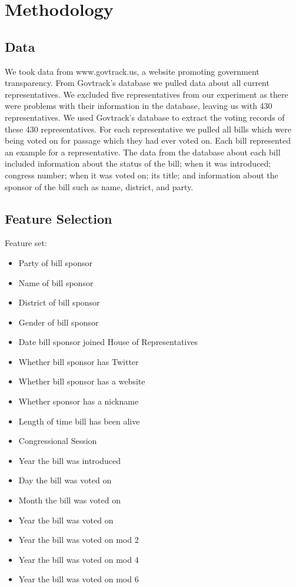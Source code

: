 \documentclass[11pt,letterpaper,twocolumn]{article}
\begin{document}
\section{Methodology}

\subsection{Data}

We took data from www.govtrack.us, a website promoting government transparency. From Govtrack's database we pulled data about all current representatives. We excluded five representatives from our experiment as there were problems with their information in the database, leaving us with 430 representatives. We used Govtrack's database to extract the voting records of these 430 representatives. For each representative we pulled all bills which were being voted on for passage which they had ever voted on. Each bill represented an example for a representative. The data from the database about each bill included information about the status of the bill; when it was introduced; congress number; when it was voted on; its title; and information about the sponsor of the bill such as name, district, and party. 

\subsection{Feature Selection}
Feature set:
\begin{itemize}
\item Party of bill sponsor
\item Name of bill sponsor
\item District of bill sponsor
\item Gender of bill sponsor
\item Date bill sponsor joined House of Representatives
\item Whether bill sponsor has Twitter
\item Whether bill sponsor has a website
\item Whether sponsor has a nickname
\item Length of time bill has been alive
\item Congressional Session
\item Year the bill was introduced
\item Day the bill was voted on
\item Month the bill was voted on
\item Year the bill was voted on
\item Year the bill was voted on mod 2
\item Year the bill was voted on mod 4
\item Year the bill was voted on mod 6
\end{itemize}
\end{document}
